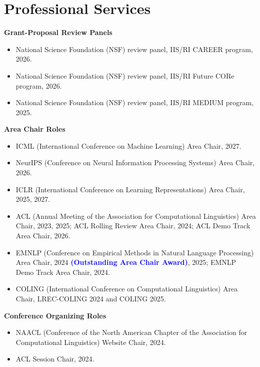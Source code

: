 \section{Professional Services}

\noindent \textbf{Grant-Proposal Review Panels}
\begin{itemize}[label={},leftmargin=15pt]
\item National Science Foundation (NSF) review panel, IIS/RI CAREER program, 2026.
\item National Science Foundation (NSF) review panel, IIS/RI Future CORe program, 2026.
\item National Science Foundation (NSF) review panel, IIS/RI MEDIUM program, 2025.
\end{itemize}

\noindent \textbf{Area Chair Roles}
\begin{itemize}[label={},leftmargin=15pt]
\item ICML (International Conference on Machine Learning) Area Chair, 2027.
\item NeurIPS (Conference on Neural Information Processing Systems) Area Chair, 2026.
\item ICLR (International Conference on Learning Representations) Area Chair, 2025, 2027.
\item ACL (Annual Meeting of the Association for Computational Linguistics) Area Chair, 2023, 2025; ACL Rolling Review Area Chair, 2024; ACL Demo Track Area Chair, 2026.
\item EMNLP (Conference on Empirical Methods in Natural Language Processing) Area Chair, 2024 \textbf{\textcolor{blue}{(Outstanding Area Chair Award)}}, 2025; EMNLP Demo Track Area Chair, 2024.
\item COLING (International Conference on Computational Linguistics) Area Chair, LREC-COLING 2024 and COLING 2025.
\end{itemize}

\noindent \textbf{Conference Organizing Roles}
\begin{itemize}[label={},leftmargin=15pt]
\item NAACL (Conference of the North American Chapter of the Association for Computational Linguistics) Website Chair, 2024.
\item ACL Session Chair, 2024.
\end{itemize}

